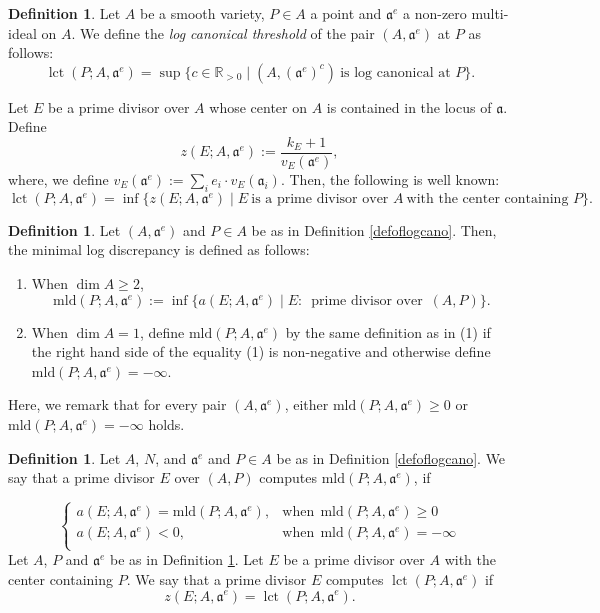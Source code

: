 \documentclass[a4paper]{amsart}
\def\RR{{\mathbb{R}}}
\renewcommand{\a}{{\mathfrak{a}}}
\newcommand{\mld}{{\mathrm{mld}}}
\newcommand{\lct}{{\operatorname{lct}}}
\theoremstyle{definition}
\newtheorem{defn}[thm]{Definition}
\begin{document}
\begin{defn}\label{defoflct}
   Let $A$ be a smooth variety, $P\in A$ a  point and $\a^e$ a non-zero multi-ideal on $A$.
   We define the {\sl log canonical threshold} of the pair $(A,\a^e)$ at $P$ as follows:
   $$\lct (P; A, \a^e)= \sup\{ c \in \RR_{>0} \mid (A, (\a^e)^c)\ \mbox{is\ log \ canonical\ at \ }P\}.$$
   
   Let $E$ be a prime divisor over $A$ whose center on $A$ is contained in the locus of $\a$.
   Define 
   $$z(E; A, \a^e):=\frac{k_E +1}{v_{E}(\a^e)},$$
   where, we define $v_E(\a^e):=\sum_i e_i\cdot v_E(\a_i)$.
   Then, the following is well known:
   $$\lct(P; A,\a^e)=
   \inf \{z(E; A, \a^e) \mid E\ \mbox{is\ a\ prime\ divisor\ over\ }A \ \mbox{with\ the \ center\ containing\ }P\}.$$
\end{defn}


\begin{defn}\label{defofmld}
    Let $(A,\a^e)$ and $P\in A$ be  as in Definition \ref{defoflogcano}.
    Then, the minimal log discrepancy is defined as follows:
    
 \begin{enumerate}
\item When $\dim A\geq 2$,
    $$\mld (P; A, \a^e)
    :=\inf\{ a(E;A, \a^e) \mid  E :\ {\operatorname { prime\ divisor \ over }}\ (A, P) \}.$$ 
\item When $\dim A=1$, define $\mld (P; A,\a^e)$ 
     by the same definition as in (1) if the right hand side
     of the equality (1) 
     is non-negative and otherwise define $\mld(P; A, \a^e)= -\infty$.
\end{enumerate}
    Here, we remark that for every pair $(A, \a^e)$, either $\mld(P; A, \a^e)\geq 0$ or
    $\mld(P; A, \a^e)=-\infty$ holds.

\end{defn}

 \begin{defn} 
    Let $A$, $N$,  and $\a^e$ and  $P\in A$ be as in Definition \ref{defoflogcano}.
    We say that a prime divisor $E$ over $(A,P)$  
    computes $\mld(P; A, \a^e)$,
    if 
    
    $$\left\{\begin{array}{ll}
       a(E; A, \a^e)=\mld(P; A, \a^e),& \mbox{when}\ \ \mld(P; A, \a^e)\geq 0\\
       a(E; A, \a^e)<0,  &    \mbox{when}\ \ \mld(P; A, \a^e)=-\infty\\ 
    \end{array}\right. $$
    Let $A$, $P$ and $\a^e$ be as in Definition \ref{defoflct}.
    Let $E$ be a prime divisor  over $A$ with the center containing $P$.
    We say that a prime divisor $E$ computes $\lct(P;A,\a^e)$ if
    $$z(E;A,\a^e)=\lct (P;A,\a^e).$$
\end{defn}
\end{document}
